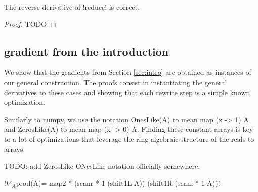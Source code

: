 \begin{proposition}
    The reverse derivative of !reduce! is correct.
\end{proposition}

\begin{proof}
    TODO
\end{proof}

\subsection{gradient from the introduction}
\label{sub:gradintro}

We show that the gradients from Section \ref{sec:intro} are obtained as instances of our general construction. 
The proofs consist in instantiating the general derivatives to these cases 
and showing that each rewrite step is a simple known optimization.

Similarly to numpy, we use the notation OnesLike(A) to mean map (x -> 1) A 
and ZerosLike(A) to mean map (x -> 0) A. 
Finding these constant arrays is key to a lot of optimizations that leverage the ring algebraic structure of the reals to arrays.

TODO: add ZerosLike ONesLike notation officially somewhere.

 \begin{lemma}
    !$\nabla_A$prod(A)= map2 * (scanr * 1 (shift1L A)) (shift1R (scanl * 1 A))!
 \end{lemma}


